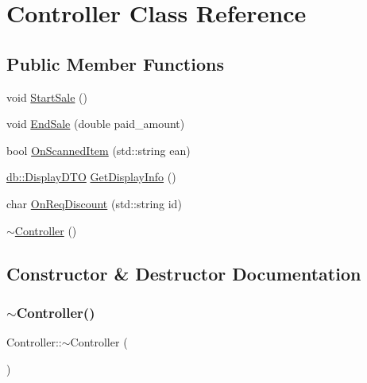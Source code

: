 \hypertarget{classController}{}\section{Controller Class Reference}
\label{classController}
\subsection*{Public Member Functions}
\begin{DoxyCompactItemize}
\item 
void \mbox{\hyperlink{classController_a0a9b1a04843990d5692b4af126b21efd}{Start\+Sale}} ()
\item 
void \mbox{\hyperlink{classController_a533d123d57b0aa61ee7e5e78dbd2ef27}{End\+Sale}} (double paid\+\_\+amount)
\item 
bool \mbox{\hyperlink{classController_a89f3bf717eacccece51eb0e18a4727e1}{On\+Scanned\+Item}} (std\+::string ean)
\item 
\mbox{\hyperlink{classdb_1_1DisplayDTO}{db\+::\+Display\+D\+TO}} \mbox{\hyperlink{classController_aed4cd2b11a4d29b7efa272b806fa0813}{Get\+Display\+Info}} ()
\item 
char \mbox{\hyperlink{classController_a72bf65a5fee35f140e4890d5dd3fd839}{On\+Req\+Discount}} (std\+::string id)
\item 
\mbox{\hyperlink{classController_a0ab87934c4f7a266cfdb86e0f36bc1b5}{$\sim$\+Controller}} ()
\end{DoxyCompactItemize}


\subsection{Constructor \& Destructor Documentation}
\mbox{\label{classController_a0ab87934c4f7a266cfdb86e0f36bc1b5}} 
\subsubsection{\texorpdfstring{$\sim$\+Controller()}{~Controller()}}
{\footnotesize\ttfamily Controller\+::$\sim$\+Controller (\begin{DoxyParamCaption}{ }\end{DoxyParamCaption})\hspace{0.3cm}{\ttfamily [inline]}}

